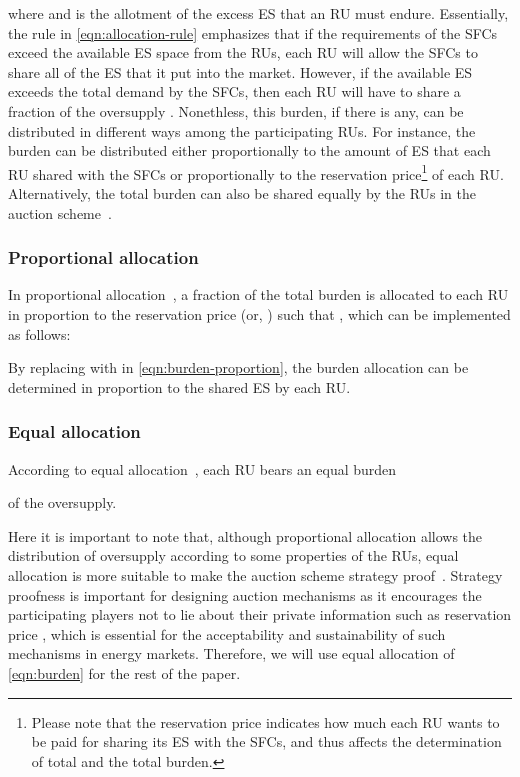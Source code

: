 \documentclass[journal,10pt]{IEEEtran}
\begin{document}
where  and  is the allotment of the excess ES  that an RU  must endure. Essentially, the rule in \eqref{eqn:allocation-rule} emphasizes that if the requirements of the SFCs exceed the available ES space from the RUs, each RU  will allow the SFCs to share all of the ES  that it put into the market. However, if the available ES exceeds the total demand by the SFCs, then each RU  will have to share a fraction of the oversupply . Nonethless, this burden, if there is any, can be distributed in different ways among the participating RUs. For instance, the burden can be distributed either proportionally to the amount of ES  that each RU  shared with the SFCs or proportionally to the reservation price\footnote{Please note that the reservation price  indicates how much each RU  wants to be paid for sharing its ES with the SFCs, and thus affects the determination of total  and the total burden.}  of each RU. Alternatively, the total burden can also be shared equally by the RUs in the auction scheme~\cite{Huang-doubleauction:2002}.

\subsubsection{Proportional allocation}\label{sec:Proportional allocation}In proportional allocation~\cite{Guojon:2012}, a fraction of the total burden  is allocated to each RU  in proportion to the reservation price  (or, ) such that , which can be implemented as follows:

By replacing  with  in \eqref{eqn:burden-proportion}, the burden allocation can be determined in proportion to the shared ES by each RU.
\subsubsection{Equal allocation}\label{sec:equal-allocation}
According to equal allocation~\cite{Huang-doubleauction:2002}, each RU bears an equal burden

of the oversupply. 

Here it is important to note that, although proportional allocation allows the distribution of oversupply according to some properties of the RUs, equal allocation is more suitable to make the auction scheme strategy proof~\cite{Huang-doubleauction:2002}. Strategy proofness  is important for designing auction mechanisms as it encourages the participating players not to lie about their private information such as reservation price \cite{Saad-CSmartgridComm:2011}, which is essential for the acceptability and sustainability of such mechanisms in energy markets. Therefore, we will use equal allocation of \eqref{eqn:burden} for the rest of the paper.
\end{document}
